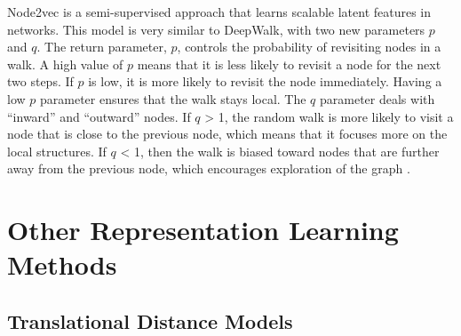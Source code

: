 Node2vec is a semi-supervised approach that learns scalable latent features in networks.
This model is very similar to DeepWalk, with two new parameters $p$ and $q$. The return parameter, $p$, controls the probability of revisiting nodes in a walk.
A high value of $p$ means that it is less likely to revisit a node for the next two steps.
If $p$ is low, it is more likely to revisit the node immediately. Having a low $p$ parameter ensures that the walk stays local.
The $q$ parameter deals with “inward” and “outward” nodes.
If $q$ > 1, the random walk is more likely to visit a node that is close to the previous node, which means that it focuses more on the local structures.
If $q$ < 1, then the walk is biased toward nodes that are further away from the previous node, which encourages exploration of the graph \cite{grover_node2vec:_2016}.

\begin{figure}[h!]
\end{figure}
\section{Other Representation Learning Methods}

\subsection{Translational Distance Models}

